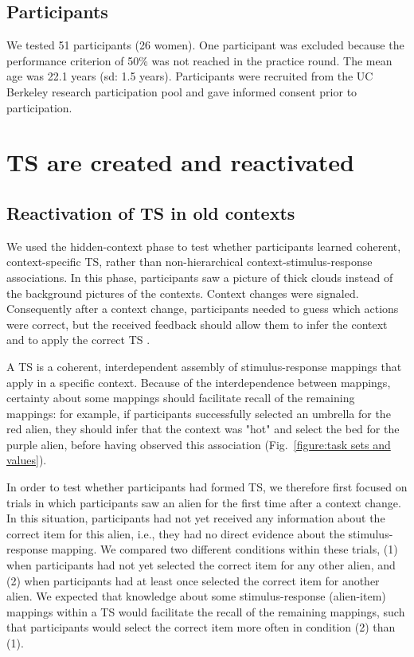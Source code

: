 \documentclass[10pt, letterpaper]{article}
\begin{document}
\subsection{Participants}

We tested 51 participants (26 women). One participant was excluded because the performance criterion of 50\% was not reached in the practice round. The mean age was 22.1 years (sd: 1.5 years). Participants were recruited from the UC Berkeley research participation pool and gave informed consent prior to participation. 


\section{TS are created and reactivated}

\subsection{Reactivation of TS in old contexts}

We used the hidden-context phase to test whether participants learned coherent, context-specific TS, rather than non-hierarchical context-stimulus-response associations. In this phase, participants saw a picture of thick clouds instead of the background pictures of the contexts. Context changes were signaled. Consequently after a context change, participants needed to guess which actions were correct, but the received feedback should allow them to infer the context and to apply the correct TS \cite{collins_reasoning_2012}.

A TS is a coherent, interdependent assembly of stimulus-response mappings that apply in a specific context. Because of the interdependence between mappings, certainty about some mappings should facilitate recall of the remaining mappings: for example, if participants successfully selected an umbrella for the red alien, they should infer that the context was "hot" and select the bed for the purple alien, before having observed this association (Fig.~\ref{figure:task sets and values}).

In order to test whether participants had formed TS, we therefore first focused on trials in which participants saw an alien for the first time after a context change. In this situation, participants had not yet received any information about the correct item for this alien, i.e., they had no direct evidence about the stimulus-response mapping. We compared two different conditions within these trials, (1) when participants had not yet selected the correct item for any other alien, and (2) when participants had at least once selected the correct item for another alien. We expected that knowledge about some stimulus-response (alien-item) mappings within a TS would facilitate the recall of the remaining mappings, such that participants would select the correct item more often in condition (2) than (1).
\end{document}

